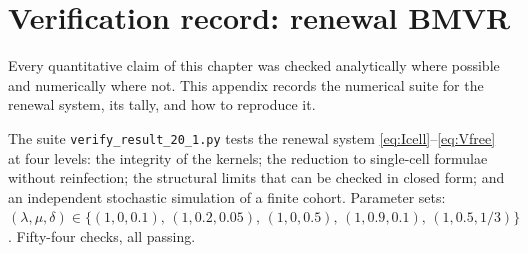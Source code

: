 
\section{Verification record: renewal BMVR}
\label{app:verification}

Every quantitative claim of this chapter was checked analytically where
possible and numerically where not. This appendix records the numerical
suite for the renewal system, its tally, and how to reproduce it.

The suite \texttt{verify\_result\_20\_1.py} tests the renewal system
\eqref{eq:Icell}--\eqref{eq:Vfree} at four levels: the integrity of the
kernels; the reduction to single-cell formulae without reinfection; the
structural limits that can be checked in closed form; and an independent
stochastic simulation of a finite cohort. Parameter sets:
$(\lambda,\mu,\delta)\in\{(1,0,0.1),\,(1,0.2,0.05),\,(1,0,0.5),\,
(1,0.9,0.1),\,(1,0.5,1/3)\}$. Fifty-four checks, all passing.

